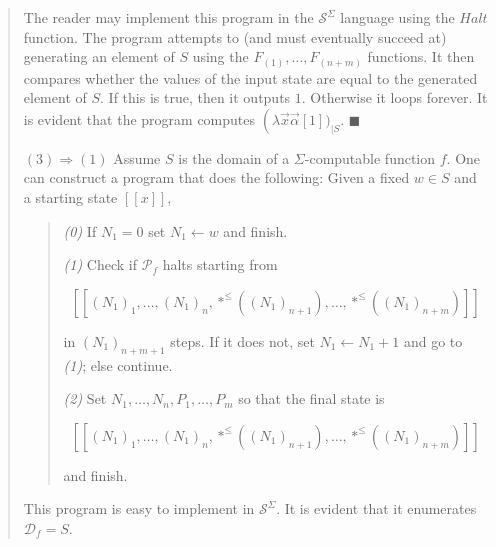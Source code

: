 \documentclass[a4paper, 12pt]{article}
\begin{document}
\begin{quote}
\begin{quote}
\end{quote}

The reader may implement this program in the $\mathcal{S}^{\Sigma}$ language
using the $Halt$ function. The program attempts to (and must eventually succeed
at) generating an element of $S$ using the $F_{(1)}, \ldots, F_{(n+m)}$
functions. It then compares whether the values of the input state are equal to
the generated element of $S$. If this is true, then it outputs $1$. Otherwise it
loops forever. It is evident that the program computes $\left(\lambda \vec{x}\vec{\alpha}
    \left[ 1 \right])_{\mid S}$. $\blacksquare$

    $(3) \Rightarrow (1)$ Assume $S$ is the domain of a $\Sigma$-computable
    function $f$. One can construct a program that does the following: Given a
    fixed $w \in S$ and a starting state $[\![ x ]\!]$,

    \begin{quote}
        \textit{(0)} If $N_1 = 0$ set $N_1 \leftarrow  w$ and finish.

        \textit{(1)} Check if $\mathcal{P}_f$ halts starting from 

        $$[\![ (N_1)_1,
        \ldots, (N_1)_{n}, *^{\leq} \left( (N_1)_{n+1} \right), \ldots, *^{\leq}
        \left( (N_1)_{n+m} \right) ]\!]$$

        in $(N_1)_{n+m+1}$ steps. If it does not, set $N_1 \leftarrow  N_1 + 1$
        and go to \textit{(1)}; else continue. 

        \textit{(2)} Set $N_1, \ldots, N_n, P_1, \ldots, P_m$ so that the final
        state is 

        $$[\![ (N_1)_1,
        \ldots, (N_1)_{n}, *^{\leq} \left( (N_1)_{n+1} \right), \ldots, *^{\leq}
        \left( (N_1)_{n+m} \right) ]\!]$$

        and finish.
    \end{quote}

    This program is easy to implement in $\mathcal{S}^{\Sigma}$. It is evident
    that it enumerates $\mathcal{D}_f = S$.

\end{quote}
\normalsize
\end{document}
